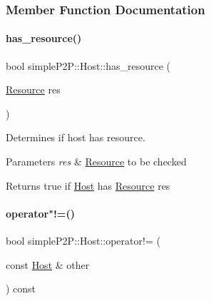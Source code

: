 \subsubsection{Member Function Documentation}
\mbox{\label{classsimpleP2P_1_1Host_a5d4b48eaf05f5353816aae78cbd29c64}} 
\paragraph{\texorpdfstring{has\+\_\+resource()}{has\_resource()}}
{\footnotesize\ttfamily bool simple\+P2\+P\+::\+Host\+::has\+\_\+resource (\begin{DoxyParamCaption}\item[{\hyperlink{classsimpleP2P_1_1Resource}{Resource}}]{res }\end{DoxyParamCaption})}



Determines if host has resource. 


\begin{DoxyParams}{Parameters}
{\em res} & \hyperlink{classsimpleP2P_1_1Resource}{Resource} to be checked \\
\hline
\end{DoxyParams}
\begin{DoxyReturn}{Returns}
true if \hyperlink{classsimpleP2P_1_1Host}{Host} has \hyperlink{classsimpleP2P_1_1Resource}{Resource} res 
\end{DoxyReturn}
\mbox{\label{classsimpleP2P_1_1Host_a13516e95bf59bb8dd6eea8940f8bb677}} 
\paragraph{\texorpdfstring{operator"!=()}{operator!=()}}
{\footnotesize\ttfamily bool simple\+P2\+P\+::\+Host\+::operator!= (\begin{DoxyParamCaption}\item[{const \hyperlink{classsimpleP2P_1_1Host}{Host} \&}]{other }\end{DoxyParamCaption}) const}



